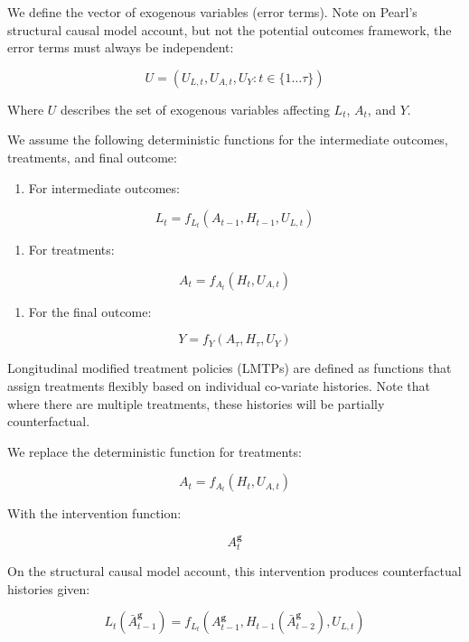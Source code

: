 \documentclass[
  single column]{article}
\providecommand{\tightlist}{%
  \setlength{\itemsep}{0pt}\setlength{\parskip}{0pt}}\usepackage{longtable,booktabs,array}
\begin{document}
We define the vector of exogenous variables (error terms). Note on
Pearl's structural causal model account, but not the potential outcomes
framework, the error terms must always be independent:

\[
U = (U_{L,t}, U_{A,t}, U_{Y}: t \in \{1 \dots \tau\})
\]

Where \(U\) describes the set of exogenous variables affecting \(L_t\),
\(A_t\), and \(Y\).

We assume the following deterministic functions for the intermediate
outcomes, treatments, and final outcome:

\begin{enumerate}
\def\labelenumi{\arabic{enumi}.}
\tightlist
\item
  For intermediate outcomes:
\end{enumerate}

\[
L_t = f_{L_t}(A_{t-1}, H_{t-1}, U_{L,t})
\]

\begin{enumerate}
\def\labelenumi{\arabic{enumi}.}
\setcounter{enumi}{1}
\tightlist
\item
  For treatments:
\end{enumerate}

\[
A_t = f_{A_t}(H_t, U_{A,t})
\]

\begin{enumerate}
\def\labelenumi{\arabic{enumi}.}
\setcounter{enumi}{2}
\tightlist
\item
  For the final outcome:
\end{enumerate}

\[
Y = f_{Y}(A_{\tau}, H_{\tau}, U_{Y})
\]

Longitudinal modified treatment policies (LMTPs) are defined as
functions that assign treatments flexibly based on individual co-variate
histories. Note that where there are multiple treatments, these
histories will be partially counterfactual.

We replace the deterministic function for treatments:

\[
A_t = f_{A_t}(H_t, U_{A,t})
\]

With the intervention function:

\[
A^\mathbf{g}_t
\]

On the structural causal model account, this intervention produces
counterfactual histories given:

\[
L_t(\bar{A}^\mathbf{g}_{t-1}) = f_{L_t}(A^\mathbf{g}_{t-1}, H_{t-1}(\bar{A}^\mathbf{g}_{t-2}), U_{L,t})
\]
\end{document}
